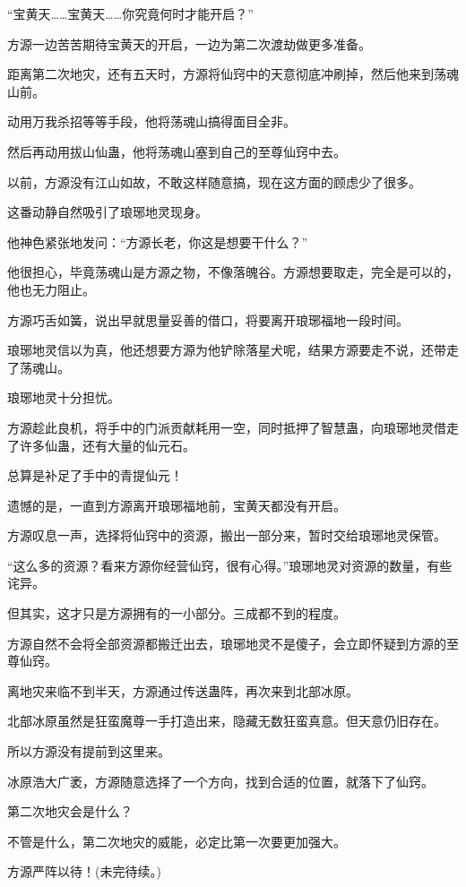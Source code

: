 \begin{this_body}
“宝黄天……宝黄天……你究竟何时才能开启？”

方源一边苦苦期待宝黄天的开启，一边为第二次渡劫做更多准备。

距离第二次地灾，还有五天时，方源将仙窍中的天意彻底冲刷掉，然后他来到荡魂山前。

动用万我杀招等等手段，他将荡魂山搞得面目全非。

然后再动用拔山仙蛊，他将荡魂山塞到自己的至尊仙窍中去。

以前，方源没有江山如故，不敢这样随意搞，现在这方面的顾虑少了很多。

这番动静自然吸引了琅琊地灵现身。

他神色紧张地发问：“方源长老，你这是想要干什么？”

他很担心，毕竟荡魂山是方源之物，不像落魄谷。方源想要取走，完全是可以的，他也无力阻止。

方源巧舌如簧，说出早就思量妥善的借口，将要离开琅琊福地一段时间。

琅琊地灵信以为真，他还想要方源为他铲除落星犬呢，结果方源要走不说，还带走了荡魂山。

琅琊地灵十分担忧。

方源趁此良机，将手中的门派贡献耗用一空，同时抵押了智慧蛊，向琅琊地灵借走了许多仙蛊，还有大量的仙元石。

总算是补足了手中的青提仙元！

遗憾的是，一直到方源离开琅琊福地前，宝黄天都没有开启。

方源叹息一声，选择将仙窍中的资源，搬出一部分来，暂时交给琅琊地灵保管。

“这么多的资源？看来方源你经营仙窍，很有心得。”琅琊地灵对资源的数量，有些诧异。

但其实，这才只是方源拥有的一小部分。三成都不到的程度。

方源自然不会将全部资源都搬迁出去，琅琊地灵不是傻子，会立即怀疑到方源的至尊仙窍。

离地灾来临不到半天，方源通过传送蛊阵，再次来到北部冰原。

北部冰原虽然是狂蛮魔尊一手打造出来，隐藏无数狂蛮真意。但天意仍旧存在。

所以方源没有提前到这里来。

冰原浩大广袤，方源随意选择了一个方向，找到合适的位置，就落下了仙窍。

第二次地灾会是什么？

不管是什么，第二次地灾的威能，必定比第一次要更加强大。

方源严阵以待！(未完待续。)

\end{this_body}

